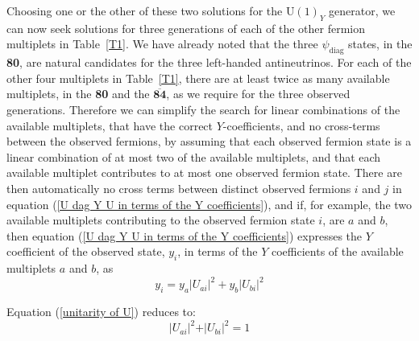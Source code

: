\documentclass[a4paper,12pt,oneside]{article}
\begin{document}
Choosing one or the other of these two solutions for the
$\mathrm{U}(1)_Y$ generator, we can now seek solutions for three
generations of each of the other fermion multiplets in \mbox{Table 
\ref{T1}}.  We have already noted that the three 
$\psi_{\mathrm{diag}}$ states, in the \textbf{80}, are natural
candidates for the three left-handed antineutrinos.  For each of the
other four multiplets in \mbox{Table \ref{T1}}, there are at least 
twice as
many available multiplets, in the \textbf{80} and the 
$\mathbf{\overline{84}}$, as we require for the three observed
generations.  Therefore we can simplify the search for linear
combinations of the available multiplets, that have the correct
$Y$-coefficients, and no cross-terms between the observed fermions,
by assuming that each observed fermion state is a linear combination
of at most two of the available multiplets, and that each available
multiplet contributes to at most one observed fermion state.  There
are then automatically no cross terms between distinct observed
fermions $i$ and $j$ in equation
(\ref{U dag Y U in terms of the Y coefficients}), and if, for 
example, the two available multiplets contributing to the observed
fermion state $i$, are $a$ and $b$, then equation
(\ref{U dag Y U in terms of the Y coefficients}) expresses the 
$Y$ coefficient of the observed state, $y_i$, in terms of the $Y$
coefficients of the available multiplets $a$ and $b$, as
\begin{equation}\label{Y coefficient of a convenient observed state}
y_i=y_a\vert U_{ai}\vert^2+y_b\vert U_{bi}\vert^2
\end{equation}

Equation (\ref{unitarity of U}) reduces to:
\begin{equation}\label{unitarity for a convenient observed state}
\vert U_{ai}\vert^2+\vert U_{bi}\vert^2=1
\end{equation}
\end{document}
